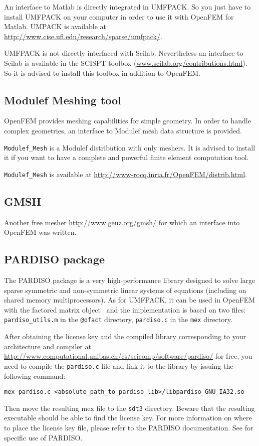 An interface to Matlab is directly integrated in UMFPACK. So you just have to install UMFPACK on your computer in order to use it with OpenFEM for Matlab. UMPACK is available at \href{http://www.cise.ufl.edu/research/sparse/umfpack/}{http://www.cise.ufl.edu/research/sparse/umfpack/}.

UMFPACK is not directly interfaced with Scilab. Nevertheless an interface to Scilab is available in the SCISPT toolbox (\href{www.scilab.org/contributions.html}{www.scilab.org/contributions.html}). So it is advised to install this toolbox in addition to OpenFEM.


\subsection{Modulef Meshing tool}

OpenFEM provides meshing capabilities for simple geometry. In order to handle complex geometries, an interface to Modulef mesh data structure is provided. 

{\tt Modulef\_Mesh} is a Modulef distribution with only meshers. It is advised to install it if you want to have a complete and powerful finite element computation tool. 

{\tt Modulef\_Mesh} is available at \href{http://www-rocq.inria.fr/OpenFEM/distrib.html}{http://www-rocq.inria.fr/OpenFEM/distrib.html}.

\subsection{GMSH}

Another free mesher \url{http://www.geuz.org/gmsh/} for which an interface into OpenFEM was written.

\subsection{PARDISO package}

The PARDISO package is a very high-performance library designed to solve large sparse symmetric and non-symmetric linear systems of equations (including on shared memory multiprocessors). As for UMFPACK, it can be used in OpenFEM with the factored matrix object \ofact\, and the implementation is based on two files: {\tt pardiso\_utils.m} in the {\tt @ofact} directory, {\tt pardiso.c} in the {\tt mex} directory. 

After obtaining the license key and the compiled library corresponding to your architecture and compiler at \href{http://www.computational.unibas.ch/cs/scicomp/software/pardiso/}{http://www.computational.unibas.ch/cs/scicomp/software/pardiso/} for free, you need to compile the {\tt pardiso.c} file and link it to the library by issuing the following command:
\begin{verbatim}
mex pardiso.c <absolute_path_to_pardiso_lib>/libpardiso_GNU_IA32.so
\end{verbatim}
Then move the resulting mex file to the {\tt sdt3} directory. Beware that the resulting executable should be able to find the license key. For more information on where to place the license key file, please refer to the PARDISO documentation. See \ofact for specific use of PARDISO.

